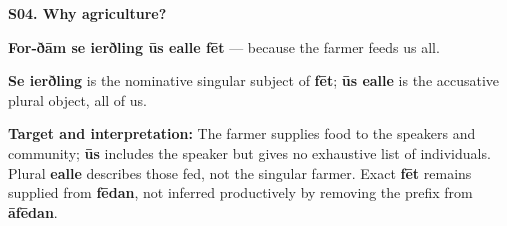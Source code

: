 \par\begin{minipage}{\linewidth}\raggedright
\textbf{S04. Why agriculture?}

\textbf{For-ðām se ierðling ūs ealle fēt} — because the farmer feeds us all.

\textbf{Se ierðling} is the nominative singular subject of \textbf{fēt}; \textbf{ūs ealle} is the accusative plural object, all of us.

\textbf{Target and interpretation:} The farmer supplies food to the speakers and community; \textbf{ūs} includes the speaker but gives no exhaustive list of individuals. Plural \textbf{ealle} describes those fed, not the singular farmer. Exact \textbf{fēt} remains supplied from \textbf{fēdan}, not inferred productively by removing the prefix from \textbf{āfēdan}.

\end{minipage}\par\addvspace{4pt}

